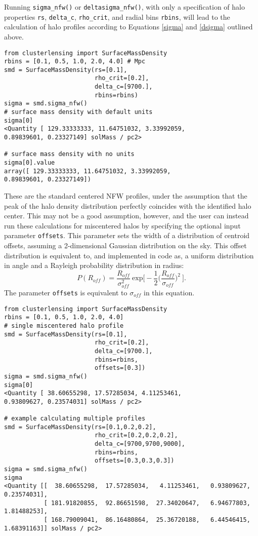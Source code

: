 \documentclass[twocolumn]{aastex6}
\newcommand{\code}{\lstinline[style=codeintext]}
\begin{document}
Running \code{sigma_nfw()} or \code{deltasigma_nfw()}, with only a specification of halo properties \code{rs}, \code{delta_c}, \code{rho_crit}, and radial bins \code{rbins}, will lead to the calculation of halo profiles according to Equations \ref{sigma} and \ref{dsigma} outlined above.

\begin{lstlisting}
from clusterlensing import SurfaceMassDensity
rbins = [0.1, 0.5, 1.0, 2.0, 4.0] # Mpc
smd = SurfaceMassDensity(rs=[0.1],
                         rho_crit=[0.2],
                         delta_c=[9700.],
                         rbins=rbins)
sigma = smd.sigma_nfw()
# surface mass density with default units
sigma[0]
<Quantity [ 129.33333333, 11.64751032, 3.33992059,
0.89839601, 0.23327149] solMass / pc2>

# surface mass density with no units
sigma[0].value
array([ 129.33333333, 11.64751032, 3.33992059,
0.89839601, 0.23327149])
\end{lstlisting}

These are the standard centered NFW profiles, under the assumption that the peak of the halo density distribution perfectly coincides with the identified halo center. This may not be a good assumption, however, and the user can instead run these calculations for miscentered halos by specifying the optional input parameter \code{offsets}. This parameter sets the width of a distribution of centroid offsets, assuming a 2-dimensional Gaussian distribution on the sky. This offset distribution is equivalent to, and implemented in code as, a uniform distribution in angle and a Rayleigh probability distribution in radius:
\begin{equation}\label{PofR}
P(R_{off})=\frac{R_{off}}{\sigma_{off}^2}\ \mathrm{exp}\bigg[-\frac{1}{2}\bigg(\frac{R_{off}}{\sigma_{off}}\bigg)^2\ \bigg].
\end{equation}
The parameter \code{offsets} is equivalent to $\sigma_{off}$ in this equation.

\begin{lstlisting}
from clusterlensing import SurfaceMassDensity
rbins = [0.1, 0.5, 1.0, 2.0, 4.0]
# single miscentered halo profile
smd = SurfaceMassDensity(rs=[0.1],
                         rho_crit=[0.2],
                         delta_c=[9700.],
                         rbins=rbins,
                         offsets=[0.3])
sigma = smd.sigma_nfw()
sigma[0]
<Quantity [ 38.60655298, 17.57285034, 4.11253461,
0.93809627, 0.23574031] solMass / pc2>

# example calculating multiple profiles
smd = SurfaceMassDensity(rs=[0.1,0.2,0.2],
                         rho_crit=[0.2,0.2,0.2],
                         delta_c=[9700,9700,9000],
                         rbins=rbins,
                         offsets=[0.3,0.3,0.3])
sigma = smd.sigma_nfw()
sigma
<Quantity [[  38.60655298,  17.57285034,   4.11253461,   0.93809627,   0.23574031],
           [ 181.91820855,  92.86651598,  27.34020647,   6.94677803,  1.81488253],
           [ 168.79009041,  86.16480864,  25.36720188,   6.44546415,  1.68391163]] solMass / pc2>
\end{lstlisting}
\end{document}
